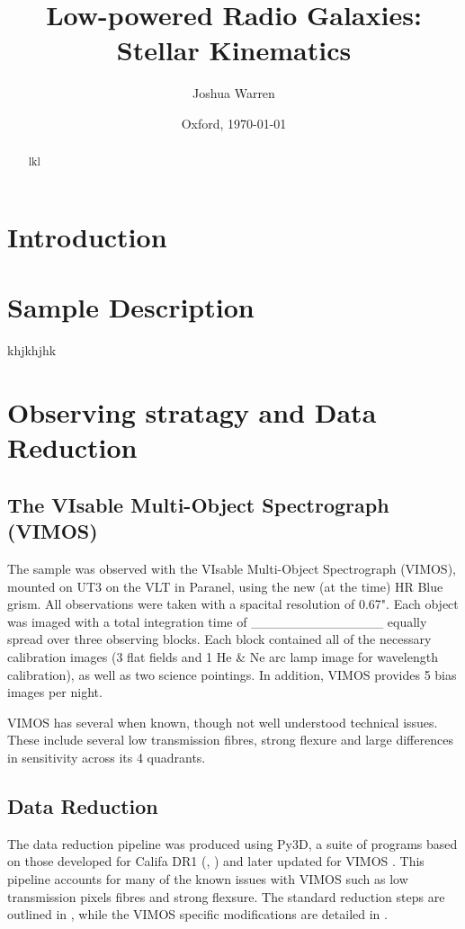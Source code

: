 \documentclass[a4paper,11pt]{article}
\begin{document}
\title{Low-powered Radio Galaxies: Stellar Kinematics}
\author{Joshua Warren}%
\date{Oxford, \today}

\begin{abstract}
lkl
\end{abstract}

\maketitle


\section{Introduction}
	\label{sec:intro}

\section{Sample Description}
	\label{sec:samp}
	khjkhjhk

\section{Observing stratagy and Data Reduction}
	\label{sec:obs}
	\subsection{The VIsable Multi-Object Spectrograph (VIMOS)}
		\label{subsec:VIMOS}
		The sample was observed with the VIsable Multi-Object Spectrograph (VIMOS), mounted on UT3 on the VLT in Paranel, using the new (at the time) HR Blue grism. All observations were taken with a spacital resolution of 0.67". Each object was imaged with a total integration time of ______________ equally spread over three observing blocks. Each block contained all of the necessary calibration images (3 flat fields and 1 He & Ne arc lamp image for wavelength calibration), as well as two science pointings. In addition, VIMOS provides 5 bias images per night. 

		VIMOS has several when known, though not well understood technical issues. These include several low transmission fibres, strong flexure and large differences in sensitivity across its 4 quadrants.

	\subsection{Data Reduction}
		\label{subsec:reduct}
		The data reduction pipeline was produced using Py3D, a suite of programs based on those developed for Califa DR1 (\cite{Sanchez2012a}, \cite{Husemann2013b}) and later updated for VIMOS \cite{Husemann2014}. This pipeline accounts for many of the known issues with VIMOS such as low transmission pixels fibres and strong flexsure. The standard reduction steps are outlined in \cite{Sanchez2012a}, while the VIMOS specific modifications are detailed in \cite{Husemann2014}. 
\end{document}
